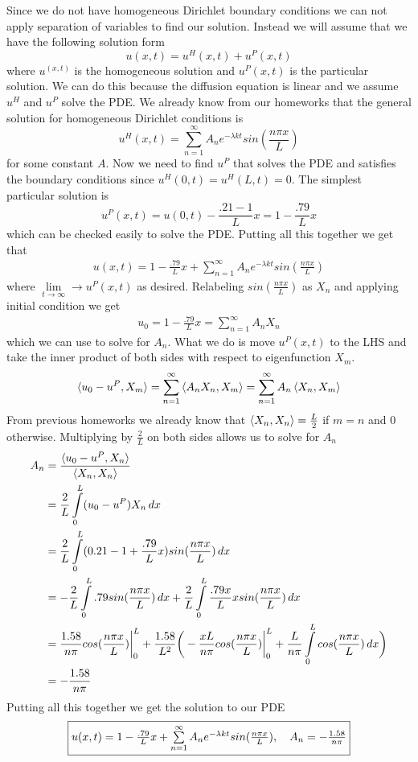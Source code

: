 \documentclass[12pt]{article}
\theoremstyle{remark}
\begin{document}
Since we do not have homogeneous Dirichlet boundary conditions we can not apply separation of variables to find our solution. Instead we will assume that we have the following solution form
$$ u(x,t) = u^H(x,t) + u^P(x,t) $$
where $u^(x,t)$ is the homogeneous solution and $u^P(x,t)$ is the particular solution. We can do this because the diffusion equation is linear and we assume $u^H$ and $u^P$ solve the PDE. We already know from our homeworks that the general solution for homogeneous Dirichlet conditions is 
$$ u^H(x,t) = \sum\limits_{n=1}^\infty A_ne^{-\lambda kt}sin(\frac{n\pi x}{L}) $$
for some constant $A$. Now we need to find $u^P$ that solves the PDE and satisfies the boundary conditions since $u^H(0,t) = u^H(L,t) = 0$. The simplest particular solution is 
$$ u^P(x,t) = u(0,t) - \frac{.21 - 1}{L}x = 1 - \frac{.79}{L}x $$
which can be checked easily to solve the PDE. Putting all this together we get that
\begin{align}
	u(x,t) = 1 - \frac{.79}{L}x + \sum\limits_{n=1}^\infty A_ne^{-\lambda kt}sin(\frac{n\pi x}{L})
\end{align}
where $\lim\limits_{t \rightarrow \infty} \rightarrow u^P(x,t)$ as desired. Relabeling $sin(\frac{n\pi x}{L})$ as $X_n$ and applying initial condition we get
\begin{align*}
u_0 = 1 - \frac{.79}{L}x = \sum\limits_{n=1}^\infty A_nX_n	
\end{align*} 
which we can use to solve for $A_n$. What we do is move $u^P(x,t)$ to the LHS and take the inner product of both sides with respect to eigenfunction $X_m$. 
\begin{align*}
	\braket{u_0 - u^P, X_m} = \sum\limits_{n=1}^\infty \braket{A_nX_n, X_m} = \sum\limits_{n=1}^\infty A_n\braket{X_n, X_m}
\end{align*}
From previous homeworks we already know that $\braket{X_n, X_n} = \frac{L}{2}$ if $m = n$ and 0 otherwise. Multiplying by $\frac{2}{L}$ on both sides allows us to solve for $A_n$
\begin{align*}
	A_n & = \frac{\braket{u_0 - u^P, X_n}}{\braket{X_n, X_n}} \\
	& = \frac{2}{L}\int\limits_0^L (u_0 - u^P)X_n \, dx \\
	& = \frac{2}{L}\int\limits_0^L (0.21 - 1 + \frac{.79}{L}x)sin(\frac{n\pi x}{L}) \, dx \\
	& = -\frac{2}{L}\int\limits_0^L .79sin(\frac{n\pi x}{L}) \, dx + \frac{2}{L}\int\limits_0^L \frac{.79x}{L}xsin(\frac{n\pi x}{L}) \, dx \\
	& = \frac{1.58}{n\pi}cos(\frac{n\pi x}{L})\bigg\vert_0^L + \frac{1.58}{L^2}\bigg(-\frac{xL}{n\pi}cos(\frac{n\pi x}{L})\bigg\vert_0^L + \frac{L}{n\pi}\int\limits_0^L cos(\frac{n\pi x}{L}) \, dx\bigg) \\
	& = -\frac{1.58}{n\pi}
\end{align*}
Putting all this together we get the solution to our PDE
\begin{align*}
	\fbox{$u(x,t) = 1 - \frac{.79}{L}x + \sum\limits_{n=1}^\infty A_ne^{-\lambda kt}sin(\frac{n\pi x}{L}), \quad A_n = -\frac{1.58}{n\pi}$}
\end{align*}
\end{document}

